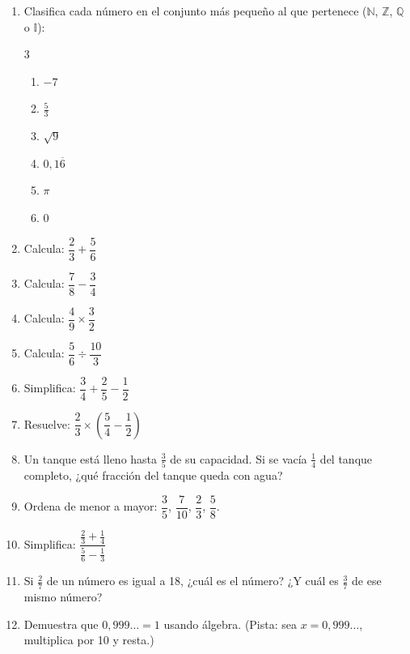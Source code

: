 \documentclass[12pt, a4paper]{article}
\begin{document}
\begin{enumerate}[leftmargin=*]
  \item \facil{} Clasifica cada número en el conjunto más pequeño al que pertenece ($\mathbb{N}$, $\mathbb{Z}$, $\mathbb{Q}$ o $\mathbb{I}$):
  \begin{multicols}{3}
  \begin{enumerate}[label=\alph*)]
    \item $-7$
    \item $\frac{5}{3}$
    \item $\sqrt{9}$
    \item $0{,}1\overline{6}$
    \item $\pi$
    \item $0$
  \end{enumerate}
  \end{multicols}

  \item \facil{} Calcula: $\dfrac{2}{3} + \dfrac{5}{6}$

  \item \facil{} Calcula: $\dfrac{7}{8} - \dfrac{3}{4}$

  \item \facil{} Calcula: $\dfrac{4}{9} \times \dfrac{3}{2}$

  \item \facil{} Calcula: $\dfrac{5}{6} \div \dfrac{10}{3}$

  \item \medio{} Simplifica: $\dfrac{3}{4} + \dfrac{2}{5} - \dfrac{1}{2}$

  \item \medio{} Resuelve: $\dfrac{2}{3} \times \left(\dfrac{5}{4} - \dfrac{1}{2}\right)$

  \item \medio{} Un tanque está lleno hasta $\frac{3}{5}$ de su capacidad. Si se vacía $\frac{1}{4}$ del tanque completo, ¿qué fracción del tanque queda con agua?

  \item \medio{} Ordena de menor a mayor: $\dfrac{3}{5}$, $\dfrac{7}{10}$, $\dfrac{2}{3}$, $\dfrac{5}{8}$.

  \item \dificil{} Simplifica: $\dfrac{\frac{2}{3} + \frac{1}{4}}{\frac{5}{6} - \frac{1}{3}}$

  \item \dificil{} Si $\frac{2}{7}$ de un número es igual a 18, ¿cuál es el número? ¿Y cuál es $\frac{3}{7}$ de ese mismo número?

  \item \dificil{} Demuestra que $0{,}999\ldots = 1$ usando álgebra. (Pista: sea $x = 0{,}999\ldots$, multiplica por 10 y resta.)
\end{enumerate}
\end{document}
